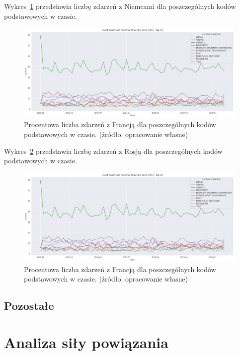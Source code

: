 \documentclass[11pt]{report}
\begin{document}
    Wykres~\ref{fig:USADEUERC} przedstawia liczbę zdarzeń z Niemcami dla poszczególnych kodów podstawowych w czasie.
    \begin{figure}[!htp]
        \centering
        \includegraphics[width=1 \textwidth]{fig/USA/USADEUERCperc.png}
        \caption{Procentowa liczba zdarzeń z Francją dla poszczególnych kodów podstawowych w czasie. (źródło: opracowanie własne)}
        \label{fig:USADEUERC}
    \end{figure}

    Wykres~\ref{fig:USARUSERC} przedstawia liczbę zdarzeń z Rosją dla poszczególnych kodów podstawowych w czasie.
    \begin{figure}[!htp]
        \centering
        \includegraphics[width=1 \textwidth]{fig/USA/USADEUERCperc.png}
        \caption{Procentowa liczba zdarzeń z Francją dla poszczególnych kodów podstawowych w czasie. (źródło: opracowanie własne)}
        \label{fig:USARUSERC}
    \end{figure}

    \subsection{Pozostałe}


    \section{Analiza siły powiązania}
\end{document}
